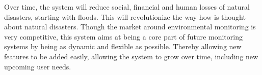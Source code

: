 Over time, the system will reduce social, financial and human losses of natural disasters, starting with floods. This will revolutionize the way how is thought about natural disasters. Though the market around environmental monitoring is very competitive, this system aims at being a core part of future monitoring systems by being as dynamic and flexible as possible. Thereby allowing new features to be added easily, allowing the system to grow over time, including new upcoming user needs.
